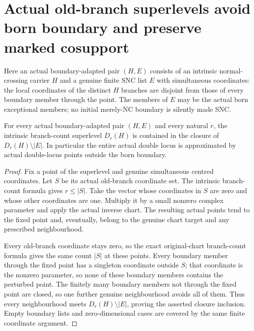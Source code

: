 \section{Actual old-branch superlevels avoid born boundary and preserve marked cosupport}
\label{sec:hironaka-normal-crossings-boundary-avoidance}

Here an actual boundary-adapted pair $(H,E)$ consists of an intrinsic
normal-crossing carrier $H$ and a genuine finite SNC list $E$ with
simultaneous coordinates: the local coordinates of the distinct $H$
branches are disjoint from those of every boundary member through the
point. The members of $E$ may be the actual born exceptional members;
no initial merely-NC boundary is silently made SNC.

\begin{theorem}
\label{hir:general-nc-actual-branch-superlevel-off-boundary-density}
For every actual boundary-adapted pair $(H,E)$ and every natural $r$,
the intrinsic branch-count superlevel $D_r(H)$ is contained in the
closure of $D_r(H)\setminus |E|$. In particular the entire actual
double locus is approximated by actual double-locus points outside
the born boundary.
\leanok
\end{theorem}
\begin{proof}
Fix a point of the superlevel and genuine simultaneous centred
coordinates. Let $S$ be its actual old-branch coordinate set. The
intrinsic branch-count formula gives $r\leq |S|$. Take the vector
whose coordinates in $S$ are zero and whose other coordinates are
one. Multiply it by a small nonzero complex parameter and apply the
actual inverse chart. The resulting actual points tend to the fixed
point and, eventually, belong to the genuine chart target and any
prescribed neighbourhood.

Every old-branch coordinate stays zero, so the exact original-chart
branch-count formula gives the same count $|S|$ at these points.
Every boundary member through the fixed point has a singleton
coordinate outside $S$; that coordinate is the nonzero parameter,
so none of these boundary members contains the perturbed point.
The finitely many boundary members not through the fixed point are
closed, so one further genuine neighbourhood avoids all of them.
Thus every neighbourhood meets $D_r(H)\setminus |E|$, proving the
asserted closure inclusion. Empty boundary lists and zero-dimensional
cases are covered by the same finite coordinate argument.
\end{proof}

